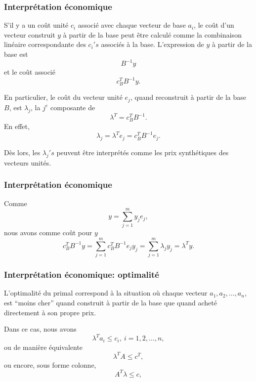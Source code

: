 \documentclass[usepdftitle=false]{beamer}
\begin{document}
\begin{frame}
\frametitle{Interprétation économique}

S'il y a un coût unité $c_i$ associé avec chaque vecteur de base $a_i$, le coût d'un vecteur construit $y$ à partir de la base peut être calculé comme la combinaison linéaire correspondante des $c_i's$ associés à la base. L'expression de $y$ à partir de la base est
\[
B^{-1}y
\]
et le coût associé
\[
c_B^T B^{-1}y.
\]

\mbox{}

En particulier, le coût du vecteur unité $e_j$, quand reconstruit à partir de la base $B$, est $\lambda_j$, la $j^e$ composante de
\[
\lambda^T = c_B^T B^{-1}.
\]
En effet,
\[
\lambda_j = \lambda^T e_j = c_B^T B^{-1} e_j.
\]

Dès lors, les $\lambda_j's$ peuvent être interprétés comme les prix synthétiques des vecteurs unités.

\end{frame}

\begin{frame}
\frametitle{Interprétation économique}

Comme
\[
y = \sum_{j = 1}^m y_j e_j,
\]
nous avons comme coût pour $y$
\[
c_B^T B^{-1}y = \sum_{j = 1}^m c_B^T B^{-1} e_j y_j = \sum_{j = 1}^m \lambda_j y_j = \lambda^T y.
\]

\end{frame}

\begin{frame}
\frametitle{Interprétation économique: optimalité}

L'optimalité du primal correspond à la situation où chaque vecteur $a_1, a_2,\ldots, a_n$, est ``moins cher'' quand construit à partir de la base que quand acheté directement à son propre prix.

\mbox{}

Dans ce cas, nous avons
\[
\lambda^T a_i \leq c_i,\ i = 1,2,\ldots,n,
\]
ou de manière équivalente
\[
\lambda^T A \leq c^T,
\]
ou encore, sous forme colonne,
\[
A^T\lambda \leq c,
\]

\end{frame}




\end{document}

